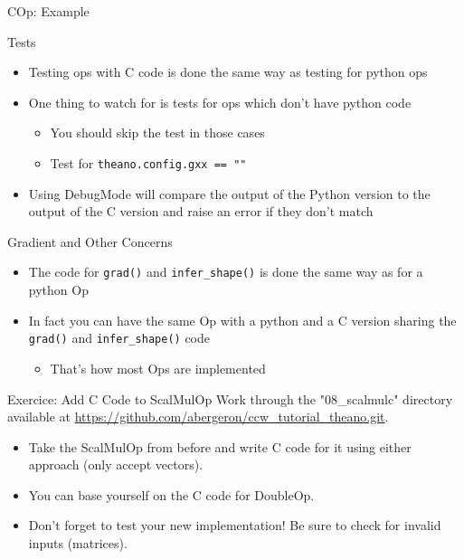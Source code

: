 \documentclass[utf8x]{beamer}
\newcommand{\code}[1]{\lstinline[emph={[2]}]|#1|}
\begin{document}
\begin{frame}{COp: Example}
\only<1>{}
\end{frame}

\begin{frame}{Tests}
\begin{itemize}
\item Testing ops with C code is done the same way as testing for python ops
\item One thing to watch for is tests for ops which don't have python code
\begin{itemize}
\item You should skip the test in those cases
\item Test for \code{theano.config.gxx == ""}
\end{itemize}
\item Using DebugMode will compare the output of the Python version to the output of the C version and raise an error if they don't match
\end{itemize}
\end{frame}

\begin{frame}{Gradient and Other Concerns}
\begin{itemize}
\item The code for \code{grad()} and \code{infer_shape()} is done the same way as for a python Op
\item In fact you can have the same Op with a python and a C version sharing the \code{grad()} and \code{infer_shape()} code
\begin{itemize}
\item That's how most Ops are implemented
\end{itemize}
\end{itemize}
\end{frame}

\begin{frame}{Exercice: Add C Code to ScalMulOp}
Work through the "08\_scalmulc" directory available at \url{https://github.com/abergeron/ccw_tutorial_theano.git}.
\begin{itemize}
\item Take the ScalMulOp from before and write C code for it using either approach (only accept vectors).
\item You can base yourself on the C code for DoubleOp.
\item Don't forget to test your new implementation! Be sure to check for invalid inputs (matrices).
\end{itemize}
\end{frame}
\end{document}
